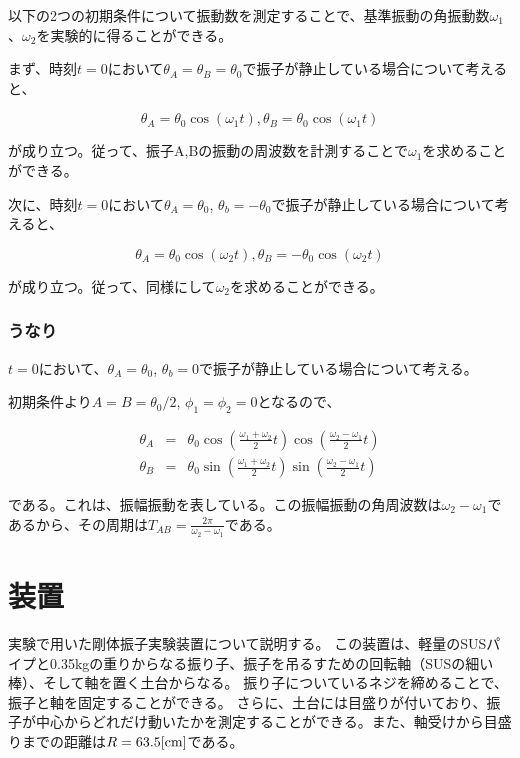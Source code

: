 \documentclass[uplatex,11pt]{jsarticle}
\begin{document}
以下の2つの初期条件について振動数を測定することで、基準振動の角振動数$\omega_1$、$\omega_2$を実験的に得ることができる。

まず、時刻$t = 0$において$\theta_A = \theta_B = \theta_0$で振子が静止している場合について考えると、

\[
    \theta_A = \theta_0\cos(\omega_1 t), \theta_B = \theta_0 \cos(\omega_1 t)
\]

が成り立つ。従って、振子A,Bの振動の周波数を計測することで$\omega_1$を求めることができる。

次に、時刻$t=0$において$\theta_A = \theta_0$, $\theta_b = - \theta_0$で振子が静止している場合について考えると、

\[
    \theta_A = \theta_0 \cos(\omega_2 t), \theta_B = - \theta_0 \cos(\omega_2 t)
\]

が成り立つ。従って、同様にして$\omega_2$を求めることができる。

\subsubsection*{うなり}

$t=0$において、$\theta_A = \theta_0$, $\theta_b = 0$で振子が静止している場合について考える。

初期条件より$A = B = \theta_0/2$, $\phi_1 = \phi_2 = 0$となるので、

\begin{eqnarray*}
    \theta_A & = & \theta_0\cos\left(\frac{\omega_1 + \omega_2}{2}t\right)\cos\left(\frac{\omega_2 - \omega_1}{2}t\right) \\
    \theta_B & = & \theta_0\sin\left(\frac{\omega_1 + \omega_2}{2}t\right)\sin\left(\frac{\omega_2 - \omega_1}{2}t\right)
\end{eqnarray*}

である。これは、振幅振動を表している。この振幅振動の角周波数は$\omega_2 - \omega_1$であるから、その周期は$T_{AB} = \frac{2\pi}{\omega_2 - \omega_1}$である。

\section{装置}

実験で用いた剛体振子実験装置について説明する。
この装置は、軽量のSUSパイプと0.35kgの重りからなる振り子、振子を吊るすための回転軸（SUSの細い棒）、そして軸を置く土台からなる。
振り子についているネジを締めることで、振子と軸を固定することができる。
さらに、土台には目盛りが付いており、振子が中心からどれだけ動いたかを測定することができる。また、軸受けから目盛りまでの距離は$R = 63.5[{\rm cm}]$である。
\end{document}
